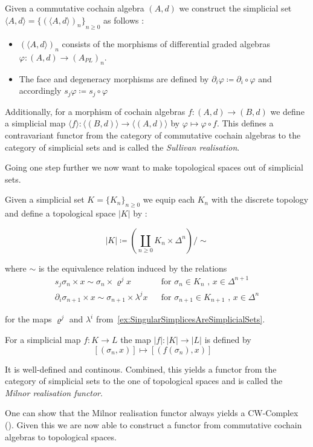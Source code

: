  \begin{Definition}
  Given a commutative cochain algebra $(A,d)$ we construct the simplicial set 
  $\langle A , d \rangle = {\lbrace (\langle A , d \rangle)_n \rbrace}_{n \geq 0}$ as follows : \\
  \begin{itemize}
   \item $(\langle A,d \rangle)_n$ consists of the morphisms of differential graded algebras 
   $\varphi \colon (A,d) \to (A_{PL})_n$.
  \item The face and degeneracy morphisms are defined by $\partial_i \varphi \coloneqq \partial_i \circ \varphi$ and
  accordingly ${s_j \varphi \coloneqq s_j \circ \varphi}$ 
  \end{itemize}

  Additionally, for a morphism of cochain algebras ${f \colon (A,d) \to (B,d)}$ we define a simplicial map
  ${\langle f \rangle \colon \langle (B,d) \rangle \to \langle (A,d) \rangle}$ by
  ${\varphi \mapsto \varphi \circ f}$. \newline
  This defines a contravariant functor from the category of commutative cochain algebras to the category of simplicial sets
  and is called the \emph{Sullivan realisation}.
 \end{Definition}

 Going one step further we now want to make topological spaces out of simplicial sets.
 
 \begin{Definition}
  Given a simplicial set $K = {\lbrace K_n \rbrace}_{n \geq 0}$ we equip each $K_n$ 
  with the discrete topology and define a topological space $|K|$ by :
  
  $$|K| \coloneqq (\coprod_{n \geq 0} K_n \times \Delta^n) / \sim$$
  
  where $\sim$ is the equivalence relation induced by the relations
  \begin{align*}
   s_j \sigma_n \times x \sim \sigma_n \times \varrho^j x & & \text{for $\sigma_n \in K_n$ , $x \in \Delta^{n+1}$} \\
   \partial_i \sigma_{n+1} \times x \sim \sigma_{n+1} \times \lambda^j x & & \text{for $\sigma_{n+1} \in K_{n+1}$ , $x \in \Delta^n$}
  \end{align*}

   
  for the maps $\varrho^j$ and $\lambda^i$ from~\ref{ex:SingularSimplicesAreSimplicialSets}.
  
  For a simplicial map $f \colon K \to L$ the map $|f| \colon |K| \to |L|$ is defined by
  $$ [(\sigma_n , x)] \mapsto [(f(\sigma_n) , x)] \quad $$
  
  It is well-defined and continous.
  Combined, this yields a functor from the category of simplicial sets to the one of topological spaces and
  is called the \emph{Milnor realisation functor}.
 \end{Definition}
 One can show that the Milnor realisation functor always yields a CW-Complex (\cite{Milnor1957}).
 Given this we are now able to construct a functor from commutative cochain algebras to topological spaces.
 
